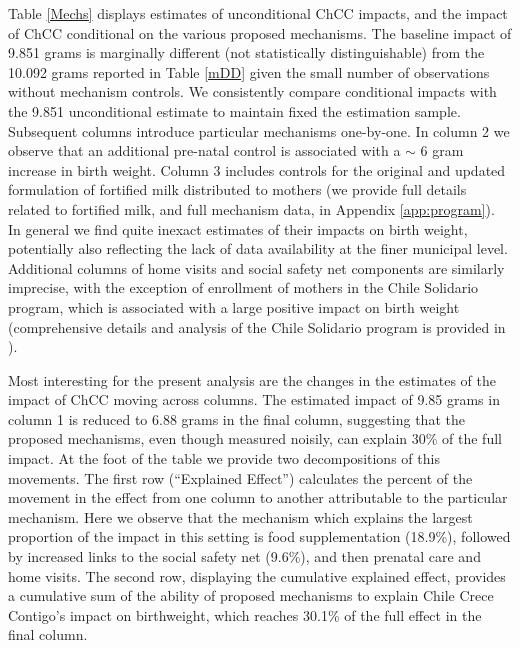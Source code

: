 \documentclass[12pt]{article}
\begin{document}
\begin{spacing}{1.4}
Table \ref{Mechs} displays estimates of unconditional ChCC impacts, and
the impact of ChCC conditional on the various proposed mechanisms.  The
baseline impact of 9.851 grams is marginally different (not statistically
distinguishable) from the 10.092 grams reported in Table \ref{mDD} given
the small number of observations without mechanism controls.  We
consistently compare conditional impacts with the 9.851 unconditional
estimate to maintain fixed the estimation sample.  Subsequent columns
introduce particular mechanisms one-by-one.  In column 2 we observe that
an additional pre-natal control is associated with a $\sim$ 6 gram increase
in birth weight.  Column 3 includes controls for the original and updated
formulation of fortified milk distributed to mothers (we provide full
details related to fortified milk, and full mechanism data, in Appendix
\ref{app:program}). In general we find quite inexact estimates of their
impacts on birth weight, potentially also reflecting the lack of data
availability at the finer municipal level.  Additional columns of home
visits and social safety net components are similarly imprecise, with the 
exception of enrollment of mothers in the Chile Solidario program, which
is associated with a large positive impact on birth weight (comprehensive
details and analysis of the Chile Solidario program is provided in
\citet{Carneiroetal2014}).



Most interesting for the present analysis are the changes in the estimates
of the impact of ChCC moving across columns.  The estimated impact of
9.85 grams in column 1 is reduced to 6.88 grams in the final column,
suggesting that the proposed mechanisms, even though measured noisily,
can explain 30\% of the full impact.  At the foot of the table we provide
two decompositions of this movements.  The first row (``Explained Effect'')
calculates the percent of the movement in the effect from one column to
another attributable to the particular mechanism.  Here we observe that
the mechanism which explains the largest proportion of the impact in this
setting is food supplementation (18.9\%), followed by increased links to the
social safety net (9.6\%), and then prenatal care and home visits.
The second row, displaying the cumulative explained effect, provides a
cumulative sum of the ability of proposed mechanisms to explain Chile
Crece Contigo's impact on birthweight, which reaches 30.1\% of the full
effect in the final column.


\end{spacing}
\end{document}
